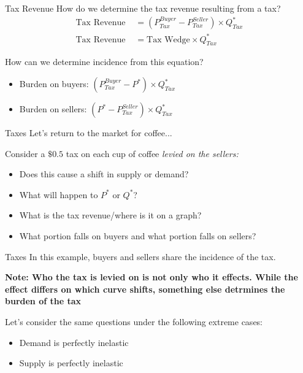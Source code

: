 \documentclass[compress]{beamer}
\begin{document}
\begin{frame}{Tax Revenue}
    How do we determine the tax revenue resulting from a tax?
    \begin{align*}
        \text{Tax Revenue } &= (P^{Buyer}_{Tax} - P^{Seller}_{Tax}) \times Q^*_{Tax} \\
        \text{Tax Revenue} &= \text{Tax Wedge} \times Q^*_{Tax}
    \end{align*}

    \begin{block}{How can we determine incidence from this equation?}
\begin{itemize}
    \item Burden on buyers: \((P^{Buyer}_{Tax} - P^*) \times Q^*_{Tax} \)
    \item Burden on sellers: \((P^* - P^{Seller}_{Tax}) \times Q^*_{Tax} \)
\end{itemize}
\end{block}
\end{frame}




\begin{frame}{Taxes}
    Let's return to the market for coffee...

    \begin{block}{Consider a $\$0.5$ tax on each cup of coffee \textit{levied on the sellers:}}
        \begin{itemize}
            \item Does this cause a shift in supply or demand?
            \item What will happen to $P^*$ or $Q^*$?
            \item What is the tax revenue/where is it on a graph?
            \item What portion falls on buyers and what portion falls on sellers?
        \end{itemize}
    \end{block}
\end{frame}

\begin{frame}{Taxes}
    In this example, buyers and sellers share the incidence of the tax.

\vspace{3mm}

    \textbf{Note: Who the tax is levied on is not only who it effects. While the effect differs on which curve shifts, something else detrmines the burden of the tax}

\vspace{3mm}
    \begin{block}{Let's consider the same questions under the following extreme cases:}
\begin{itemize}
    \item Demand is perfectly inelastic
    \item Supply is perfectly inelastic
\end{itemize}
    \end{block}
\end{frame}
\end{document}
